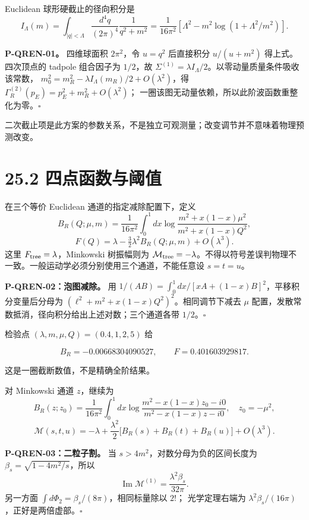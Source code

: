 \documentclass[
  11pt,
  oneside]{book}
\begin{document}
Euclidean 球形硬截止的径向积分是 \[
I_\Lambda(m)=\int_{|q|<\Lambda}\frac{d^4q}{(2\pi)^4}
\frac1{q^2+m^2}
=\frac1{16\pi^2}\left[\Lambda^2-m^2\log(1+\Lambda^2/m^2)\right].
\] \protect\hypertarget{p-qren-01}{}{}

\textbf{P-QREN-01。} 四维球面积 \(2\pi^2\)，令 \(u=q^2\) 后直接积分
\(u/(u+m^2)\) 得上式。四次顶点的 tadpole 组合因子为 \(1/2\)，故
\(\Sigma^{(1)}=\lambda I_\Lambda/2\)。以零动量质量条件吸收该常数，
\(m_0^2=m_R^2-\lambda I_\Lambda(m_R)/2+O(\lambda^2)\)，得
\(\Gamma_R^{(2)}(p_E)=p_E^2+m_R^2+O(\lambda^2)\)；
一圈该图无动量依赖，所以此阶波函数重整化为零。\(\square\)

二次截止项是此方案的参数关系，不是独立可观测量；改变调节并不意味着物理预测改变。

\hypertarget{ux56dbux70b9ux51fdux6570ux4e0eux9608ux503c}{%
\section{25.2
四点函数与阈值}\label{ux56dbux70b9ux51fdux6570ux4e0eux9608ux503c}}

在三个等价 Euclidean 通道的指定减除配置下，定义 \[
B_R(Q;\mu,m)=\frac1{16\pi^2}\int_0^1dx
\log\frac{m^2+x(1-x)\mu^2}{m^2+x(1-x)Q^2},
\] \[
F(Q)=\lambda-\tfrac32\lambda^2 B_R(Q;\mu,m)+O(\lambda^3).
\] 这里 \(F_{\rm tree}=\lambda\)，Minkowski 树振幅则为
\(\mathcal M_{\rm tree}=-\lambda\)。不得以符号差误判物理不一致。一般运动学必须分别使用三个通道，不能任意设
\(s=t=u\)。

\protect\hypertarget{p-qren-02}{}{}

\textbf{P-QREN-02：泡图减除。} 用
\(1/(AB)=\int_0^1dx/[xA+(1-x)B]^2\)，平移积分变量后分母为
\((\ell^2+m^2+x(1-x)Q^2)^2\)。相同调节下减去 \(\mu\)
配置，发散常数抵消，径向积分给出上述对数；三个通道各带
\(1/2\)。\(\square\)

检验点 \((\lambda,m,\mu,Q)=(0.4,1,2,5)\) 给

\[
B_R=-0.00668304090527,\qquad F=0.401603929817.
\]

这是一圈截断数值，不是精确全阶结果。

对 Minkowski 通道 \(z\)，继续为 \[
B_R(z;z_0)=\frac1{16\pi^2}\int_0^1dx
\log\frac{m^2-x(1-x)z_0-i0}{m^2-x(1-x)z-i0},
\quad z_0=-\mu^2,
\] \[
\mathcal M(s,t,u)=-\lambda+
\frac{\lambda^2}{2}\bigl[B_R(s)+B_R(t)+B_R(u)\bigr]+O(\lambda^3).
\] \protect\hypertarget{p-qren-03}{}{}

\textbf{P-QREN-03：二粒子割。} 当 \(s>4m^2\)，对数分母为负的区间长度为
\(\beta_s=\sqrt{1-4m^2/s}\)，所以 \[
\operatorname{Im}\mathcal M^{(1)}=\frac{\lambda^2\beta_s}{32\pi}.
\] 另一方面 \(\int d\Phi_2=\beta_s/(8\pi)\)，相同标量除以 \(2!\)；
光学定理右端为 \(\lambda^2\beta_s/(16\pi)\)，正好是两倍虚部。\(\square\)
\end{document}
